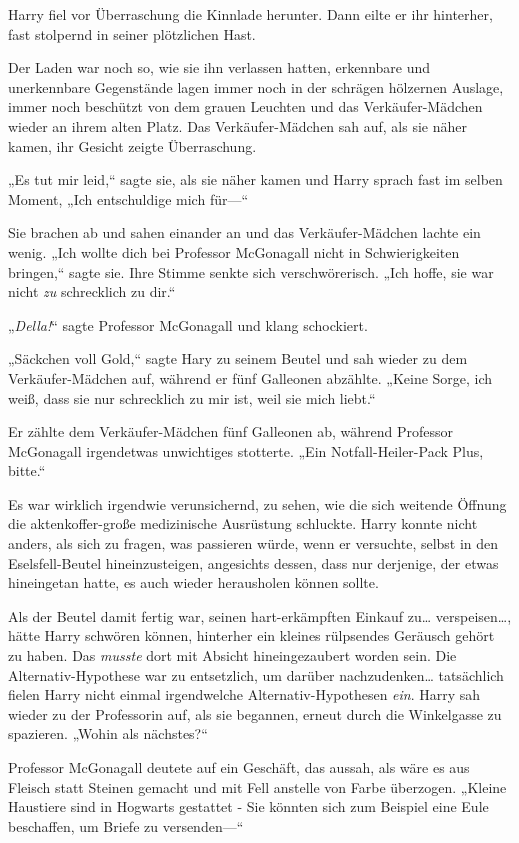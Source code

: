 {Harry fiel vor Überraschung die Kinnlade herunter. Dann eilte er ihr hinterher, fast stolpernd in seiner plötzlichen Hast.

\later

Der Laden war noch so, wie sie ihn verlassen hatten, erkennbare und unerkennbare Gegenstände lagen immer noch in der schrägen hölzernen Auslage, immer noch beschützt von dem grauen Leuchten und das Verkäufer-Mädchen wieder an ihrem alten Platz. Das Verkäufer-Mädchen sah auf, als sie näher kamen, ihr Gesicht zeigte Überraschung.

„Es tut mir leid,“ sagte sie, als sie näher kamen und Harry sprach fast im selben Moment, „Ich entschuldige mich für—“

Sie brachen ab und sahen einander an und das Verkäufer-Mädchen lachte ein wenig. „Ich wollte dich bei Professor McGonagall nicht in Schwierigkeiten bringen,“ sagte sie. Ihre Stimme senkte sich verschwörerisch. „Ich hoffe, sie war nicht \emph{zu} schrecklich zu dir.“

„\emph{Della!}“ sagte Professor McGonagall und klang schockiert.

„Säckchen voll Gold,“ sagte Hary zu seinem Beutel und sah wieder zu dem Verkäufer-Mädchen auf, während er fünf Galleonen abzählte. „Keine Sorge, ich weiß, dass sie nur schrecklich zu mir ist, weil sie mich liebt.“

Er zählte dem Verkäufer-Mädchen fünf Galleonen ab, während Professor McGonagall irgendetwas unwichtiges stotterte. „Ein Notfall-Heiler-Pack Plus, bitte.“

Es war wirklich irgendwie verunsichernd, zu sehen, wie die sich weitende Öffnung die aktenkoffer-große medizinische Ausrüstung schluckte. Harry konnte nicht anders, als sich zu fragen, was passieren würde, wenn er versuchte, selbst in den Eselsfell-Beutel hineinzusteigen, angesichts dessen, dass nur derjenige, der etwas hineingetan hatte, es auch wieder herausholen können sollte.

Als der Beutel damit fertig war, seinen hart-erkämpften Einkauf zu… verspeisen…, hätte Harry schwören können, hinterher ein kleines rülpsendes Geräusch gehört zu haben. Das \emph{musste} dort mit Absicht hineingezaubert worden sein. Die Alternativ-Hypothese war zu entsetzlich, um darüber nachzudenken… tatsächlich fielen Harry nicht einmal irgendwelche Alternativ-Hypothesen \emph{ein}. Harry sah wieder zu der Professorin auf, als sie begannen, erneut durch die Winkelgasse zu spazieren. „Wohin als nächstes?“

Professor McGonagall deutete auf ein Geschäft, das aussah, als wäre es aus Fleisch statt Steinen gemacht und mit Fell anstelle von Farbe überzogen. „Kleine Haustiere sind in Hogwarts gestattet - Sie könnten sich zum Beispiel eine Eule beschaffen, um Briefe zu versenden—“

}
